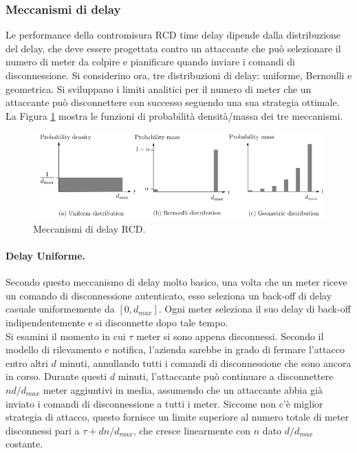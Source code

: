 \subsubsection{Meccanismi di delay}
Le performance della contromisura RCD time delay dipende dalla distribuzione del delay, che deve essere progettata contro un attaccante che può selezionare il numero di meter da colpire e pianificare quando inviare i comandi di disconnessione. Si considerino ora, tre distribuzioni di delay: uniforme, Bernoulli e geometrica. Si sviluppano i limiti analitici per il numero di meter che un attaccante può disconnettere con successo seguendo una sua strategia ottimale. La Figura \ref{distributions_img} mostra le funzioni di probabilità densità/massa dei tre meccanismi.
\begin{figure}[hbtp]
	\centering
	\includegraphics[scale=.45]{imgs/attack/distributions.png}
	\caption{Meccanismi di delay RCD.}
	\label{distributions_img}
\end{figure}
\paragraph{Delay Uniforme.} Secondo questo meccanismo di delay molto basico, una volta che un meter riceve un comando di disconnessione autenticato, esso seleziona un back-off di delay casuale uniformemente da $[0, d_{max}]$. Ogni meter seleziona il suo delay di back-off indipendentemente e si disconnette dopo tale tempo.\\
Si esamini il momento in cui $\tau$ meter si sono appena disconnessi. Secondo il modello di rilevamento e notifica, l'azienda sarebbe in grado di fermare l'attacco entro altri $d$ minuti, annullando tutti i comandi di disconnessione che sono ancora in corso. Durante questi $d$ minuti, l'attaccante può continuare a disconnettere $nd/d_{max}$ meter aggiuntivi in media, assumendo che un attaccante abbia già inviato i comandi di disconnessione a tutti i meter. Siccome non c'è miglior strategia di attacco, questo fornisce un limite superiore al numero totale di meter disconnessi pari a $\tau + dn/d_{max}$, che cresce linearmente con $n$ dato $d/d_{max}$ costante.
